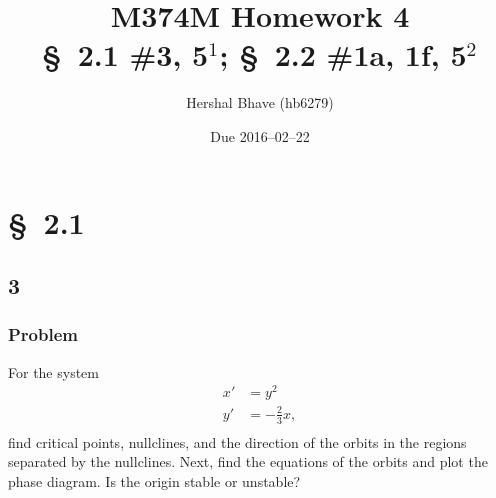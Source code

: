 \documentclass[12pt]{article}
\title{M374M Homework 4 \\
  \normalsize{\S~2.1 \#3, 5$^1$; \S~2.2 \#1a, 1f, 5$^2$}}
\author{Hershal Bhave (hb6279)}
\date{Due 2016--02--22}
\begin{document}
\maketitle
\section{\S~2.1}
\subsection{3}
\subsubsection*{Problem}
For the system
\begin{equation}
  \begin{aligned}
    x'&=y^2 \\
    y'&=-\frac{2}{3}x, \\
  \end{aligned}
\end{equation}
find critical points, nullclines, and the direction of the orbits in the regions
separated by the nullclines. Next, find the equations of the orbits and plot the
phase diagram. Is the origin stable or unstable?
\end{document}
